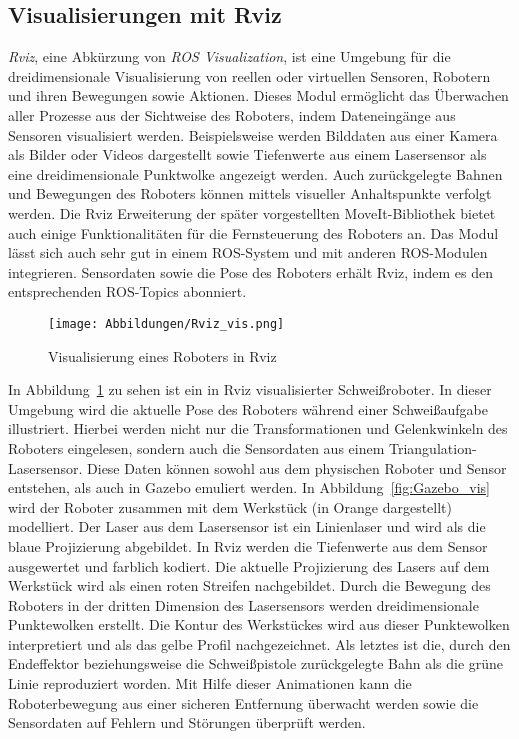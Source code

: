 \subsection{Visualisierungen mit Rviz}
\emph{Rviz}, eine Abkürzung von \emph{ROS Visualization}, ist eine Umgebung für die dreidimensionale Visualisierung von reellen oder virtuellen Sensoren, Robotern und ihren Bewegungen sowie Aktionen. Dieses Modul ermöglicht das Überwachen aller Prozesse aus der Sichtweise des Roboters, indem Dateneingänge aus Sensoren visualisiert werden. Beispielsweise werden Bilddaten aus einer Kamera als Bilder oder Videos dargestellt sowie Tiefenwerte aus einem Lasersensor als eine dreidimensionale Punktwolke angezeigt werden. Auch zurückgelegte Bahnen und Bewegungen des Roboters können mittels visueller Anhaltspunkte verfolgt werden. Die Rviz Erweiterung der später vorgestellten MoveIt-Bibliothek bietet auch einige Funktionalitäten für die Fernsteuerung des Roboters an. Das Modul lässt sich auch sehr gut in einem ROS-System und mit anderen ROS-Modulen integrieren. Sensordaten sowie die Pose des Roboters erhält Rviz, indem es den entsprechenden ROS-Topics abonniert. \autocite[177-180]{NewmanWyattS2018ASAt} \autocite[126-127]{QuigleyROS2015} \autocite[243]{LentinMasteringROS2018} \autocite[36-40]{FairchildROS2017}
\begin{figure}[h]
	\texttt{[image: Abbildungen/Rviz\_vis.png]}
	\centering
	\caption{Visualisierung eines Roboters in Rviz}
	\label{fig:Rviz_vis}
\end{figure}

In Abbildung~\ref{fig:Rviz_vis} zu sehen ist ein in Rviz visualisierter Schweißroboter. In dieser Umgebung wird die aktuelle Pose des Roboters während einer Schweißaufgabe illustriert. Hierbei werden nicht nur die Transformationen und Gelenkwinkeln des Roboters eingelesen, sondern auch die Sensordaten aus einem Triangulation-Lasersensor. Diese Daten können sowohl aus dem physischen Roboter und Sensor entstehen, als auch in Gazebo emuliert werden. In Abbildung~\ref{fig:Gazebo_vis} wird der Roboter zusammen mit dem Werkstück (in Orange dargestellt) modelliert. Der Laser aus dem Lasersensor ist ein Linienlaser und wird als die blaue Projizierung abgebildet. In Rviz werden die Tiefenwerte aus dem Sensor ausgewertet und farblich kodiert. Die aktuelle Projizierung des Lasers auf dem Werkstück wird als einen roten Streifen nachgebildet. Durch die Bewegung des Roboters in der dritten Dimension des Lasersensors werden dreidimensionale Punktewolken erstellt. Die Kontur des Werkstückes wird aus dieser Punktewolken interpretiert und als das gelbe Profil nachgezeichnet. Als letztes ist die, durch den Endeffektor beziehungsweise die Schweißpistole zurückgelegte Bahn als die grüne Linie reproduziert worden. Mit Hilfe dieser Animationen kann die Roboterbewegung aus einer sicheren Entfernung überwacht werden sowie die Sensordaten auf Fehlern und Störungen überprüft werden.


